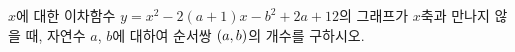 $x$에 대한 이차함수 $y=x^2-2(a+1)x-b^2+2a+12$의 그래프가 $x$축과 만나지 않을 때, 자연수 $a$, $b$에 대하여 순서쌍 $(a{,}\mkern3mu\mathopen{}b)$의 개수를 구하시오.
